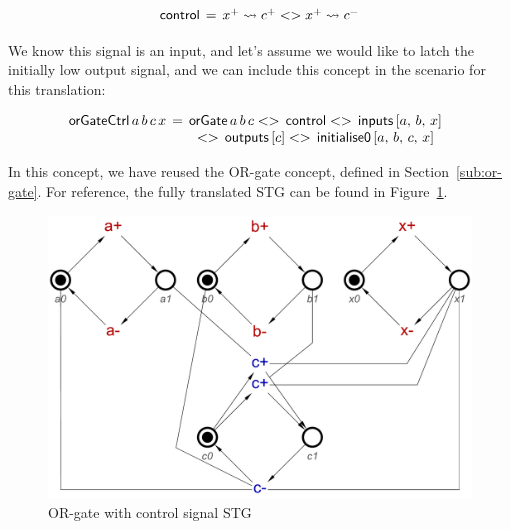 \documentclass[british,conference,compsoc]{IEEEtran}
\begin{document}
\[
\begin{array}{lcl}
\mathsf{control}&\hspace{-2mm}=&\hspace{-2mm}x^{+} \rightsquigarrow c^{+} 
	<> x^{+} \rightsquigarrow c^{-} 
\end{array}
\]

We know this signal is an input, and let's assume we would like to latch
the initially low output signal, and we can include this concept in the 
scenario for this translation:

\[
\begin{array}{lcl}
\hspace{-2mm}\mathsf{orGateCtrl}\,  a \, b \, c \, x &\hspace{-2mm}=
	&\hspace{-2mm}\mathsf{orGate}\, a\, b\, c <>\, \mathsf{control}
	<>\, \mathsf{inputs}\, [a,\, b,\, x] \\
&& <> \, \mathsf{outputs} \,  [c] <>\, \mathsf{initialise0}\, [a,\, b,\, c,\, x]
\end{array}
\]

In this concept, we have reused the OR-gate concept, defined in 
Section~\ref{sub:or-gate}. For reference, the fully translated STG can be found 
in Figure~\ref{fig:or-gate-ctrl}.


\begin{figure}[h]
\begin{centering}
\includegraphics[scale=0.25]{Images/or-gate-ctrl-stg}
\par\end{centering}
\protect\caption{\label{fig:or-gate-ctrl} OR-gate with control signal STG}
\end{figure}
\end{document}
